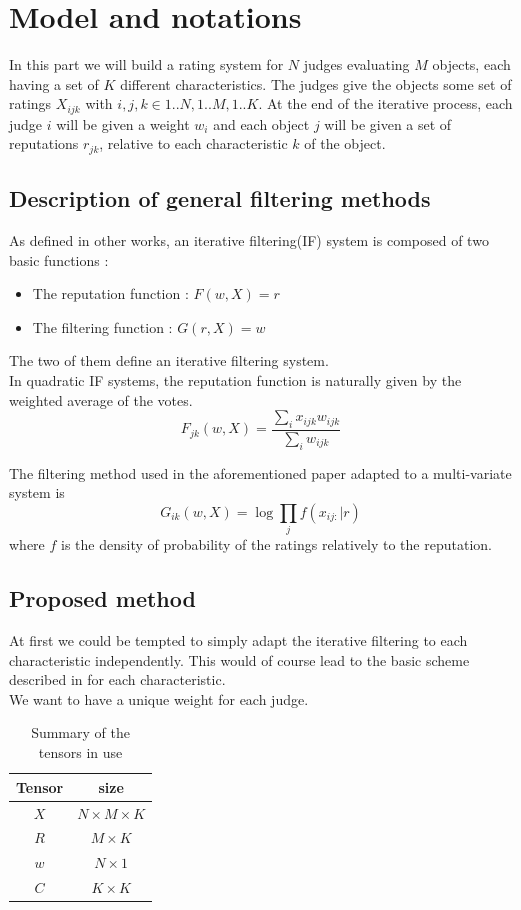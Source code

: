 \documentclass[12pt,a4paper]{article}
\begin{document}
\section{Model and notations}
In this part we will build a rating system for $N$ judges evaluating $M$ objects, each having a set of $K$ different characteristics. 
The judges give the objects some set of ratings $X_{ijk}$ with $i,j,k \in {1..N},{1..M},{1..K}$.
At the end of the iterative process, each judge $i$ will be given a weight $w_{i}$ and each object $j$ will be given a set of reputations $r_{jk}$, relative to each characteristic $k$ of the object.

\subsection{Description of general filtering methods}
As defined in other works, an iterative filtering(IF) system is composed of two basic functions \cite{Cristo1} : 
\begin{itemize}
\item The reputation function : $F(w,X)=r$
\item The filtering function : $G(r,X)=w$
\end{itemize}
The two of them define an iterative filtering system.\\
In quadratic IF systems, the reputation function is naturally given by the weighted average of the votes.
$$F_{jk}(w,X) = \frac{\sum_{i}x_{ijk}w_{ijk}}{\sum_i w_{ijk}}$$

The filtering method used in the aforementioned paper adapted to a multi-variate system is 
$$G_{ik}(w,X) = \log \prod_j f(x_{ij:}|r)$$
where $f$ is the density of probability of the ratings relatively to the reputation.

\subsection{Proposed method}
At first we could be tempted to simply adapt the iterative filtering to each characteristic independently. This would of course lead to the basic scheme described in \cite{Cristo1} for each characteristic.\\
We want to have a unique weight for each judge. 

\begin{table}
\centering
\begin{tabular}{|c|c|}
\hline 
Tensor & size\\
\hline
$X$ & $N\times M \times K$\\
\hline
$R$ & $M\times K$\\
\hline
$w$ & $N\times 1$\\
\hline
$C$ & $K\times K$\\
\hline
\end{tabular}
\caption{Summary of the tensors in use}
\end{table}
\end{document}
